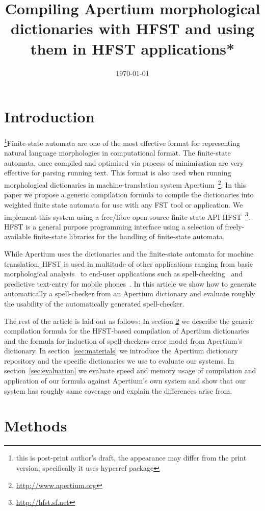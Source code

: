 \documentclass[10pt,a4paper]{article}
\title{Compiling Apertium morphological dictionaries with HFST and using them
in HFST applications*
}
\date{\today}
\begin{document}
\maketitleabstract

\section{Introduction}

{}\footnote{this is post-print author's draft, the appearance may differ from
the print version; specifically it uses hyperref package}Finite-state automata
are one of the most effective format for representing natural language
morphologies in computational format. The finite-state automata, once compiled
and optimised via process of minimisation are very effective for parsing
running text. This format is also used when running morphological dictionaries
in machine-translation system
Apertium~\cite{Apertium/2011}\footnote{\url{http://www.apertium.org}}. In this
paper we propose a generic compilation formula  to compile the dictionaries
into weighted finite state automata for use with any FST tool or application.
We implement this system using a free/libre open-source finite-state API
HFST~\cite{hfst/2011}\footnote{\url{http://hfst.sf.net}}. HFST is a general
purpose programming interface using a selection of freely-available
finite-state libraries for the handling of finite-state automata.

While Apertium uses the dictionaries and the finite-state automata for machine
translation, HFST is used in multitude of other applications ranging from
basic morphological analysis~\cite{hfst/2011}
to end-user applications such as spell-checking~\cite{pirinen/2010/lrec} and
predictive text-entry for mobile phones~\cite{silfverberg/2011/cla}. In this
article we show how to generate automatically a spell-checker from an Apertium
dictionary and evaluate roughly the usability of the automatically generated
spell-checker.

The rest of the article is laid out as follows: In section \ref{sec:methods}
we describe the generic compilation formula for the HFST-based compilation of
Apertium dictionaries and the formula for induction of spell-checkers error
model from Apertium's dictionary. In section~\ref{sec:materials} we introduce
the Apertium dictionary repository and the specific dictionaries we use to
evaluate our systems. In section~\ref{sec:evaluation} we evaluate speed and
memory usage of compilation and application of our formula against Apertium's
own system and show that our system has roughly same coverage and explain
the differences arise from.

\section{Methods}
\label{sec:methods}
\end{document}
